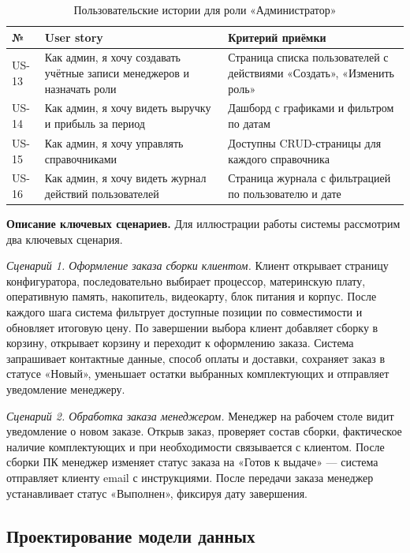 \begin{table}[ht!]
\caption{Пользовательские истории для роли «Администратор»}
\label{tab:us-adm}
\small
\begin{tabularx}{\textwidth}{|>{\centering\arraybackslash}p{}|>{\RaggedRight\arraybackslash}X|>{\RaggedRight\arraybackslash}X|}
\hline
\textbf{№} & \textbf{User story} & \textbf{Критерий приёмки} \\ \hline
US-13 & Как админ, я хочу создавать учётные записи менеджеров и назначать роли & Страница списка пользователей с действиями «Создать», «Изменить роль» \\ \hline
US-14 & Как админ, я хочу видеть выручку и прибыль за период & Дашборд с графиками и фильтром по датам \\ \hline
US-15 & Как админ, я хочу управлять справочниками & Доступны CRUD-страницы для каждого справочника \\ \hline
US-16 & Как админ, я хочу видеть журнал действий пользователей & Страница журнала с фильтрацией по пользователю и дате \\ \hline
\end{tabularx}
\end{table}

\textbf{Описание ключевых сценариев.} Для иллюстрации работы системы рассмотрим два ключевых сценария.

\emph{Сценарий 1. Оформление заказа сборки клиентом.} Клиент открывает страницу конфигуратора, последовательно выбирает процессор, материнскую плату, оперативную память, накопитель, видеокарту, блок питания и корпус. После каждого шага система фильтрует доступные позиции по совместимости и обновляет итоговую цену. По завершении выбора клиент добавляет сборку в корзину, открывает корзину и переходит к оформлению заказа. Система запрашивает контактные данные, способ оплаты и доставки, сохраняет заказ в статусе «Новый», уменьшает остатки выбранных комплектующих и отправляет уведомление менеджеру.

\emph{Сценарий 2. Обработка заказа менеджером.} Менеджер на рабочем столе видит уведомление о новом заказе. Открыв заказ, проверяет состав сборки, фактическое наличие комплектующих и при необходимости связывается с клиентом. После сборки ПК менеджер изменяет статус заказа на «Готов к выдаче» --- система отправляет клиенту email с инструкциями. После передачи заказа менеджер устанавливает статус «Выполнен», фиксируя дату завершения.

\subsection{Проектирование модели данных}

